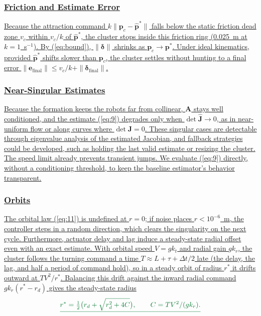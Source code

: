 \documentclass[lettersize,journal]{IEEEtran}
\providecommand{\DIFadd}[1]{{\protect\color{DIFaddtx}\uline{#1}}} %
\begin{document}
\subsubsection{\DIFadd{Friction and Estimate Error}}
\DIFadd{Because the attraction command $k\|\mathbf{p}_c - \hat{\mathbf{p}}^*\|$ falls below the static friction dead zone $v_c$ within $v_c/k$ of $\hat{\mathbf{p}}^*$, the cluster stops inside this friction ring (0.025~m at $k = 1$~s$^{-1}$). By (\ref{eq:bound}), $\|\boldsymbol{\delta}\|$ shrinks as $\mathbf{p}_c \to \mathbf{p}^*$. Under ideal kinematics, provided $\hat{\mathbf{p}}^*$ shifts slower than $\mathbf{p}_c$, the cluster settles without hunting to a final error $\|\mathbf{e}_{\text{final}}\| \le v_c/k + \|\boldsymbol{\delta}_{\text{final}}\|$.
}

\subsubsection{\DIFadd{Near-Singular Estimates}}
\DIFadd{Because the formation keeps the robots far from collinear, $\mathbf{A}$ stays well conditioned, and the estimate (\ref{eq:9}) degrades only when $\det\hat{\mathbf{J}} \to 0$, as in near-uniform flow or along curves where $\det\mathbf{J} = 0$. These singular cases are detectable through eigenvalue analysis of the estimated Jacobian, and fallback strategies could be developed, such as holding the last valid estimate or resizing the cluster. The speed limit already prevents transient jumps. We evaluate (\ref{eq:9}) directly, without a conditioning threshold, to keep the baseline estimator's behavior transparent.
}

\subsubsection{\DIFadd{Orbits}}
\DIFadd{The orbital law (\ref{eq:11}) is undefined at $r = 0$; if noise places $r < 10^{-6}$~m, the controller steps in a random direction, which clears the singularity on the next cycle. Furthermore, actuator delay and lag induce a steady-state radial offset even with an exact estimate. With orbital speed $V = gk_t$ and radial gain $gk_r$, the cluster follows the turning command a time $T \approx L + \tau + \Delta t/2$ late (the delay, the lag, and half a period of command hold), so in a steady orbit of radius $r^*$ it drifts outward at $TV^2/r^*$. Balancing this drift against the inward radial command $gk_r(r^* - r_d)$ gives the steady-state radius
}\begin{equation}\DIFadd{\label{eq:orbit_cf}
r^* = \tfrac{1}{2}\bigl(r_d + \sqrt{r_d^2 + 4C}\bigr), \qquad C = TV^2/(gk_r).
}\end{equation}
\end{document}
